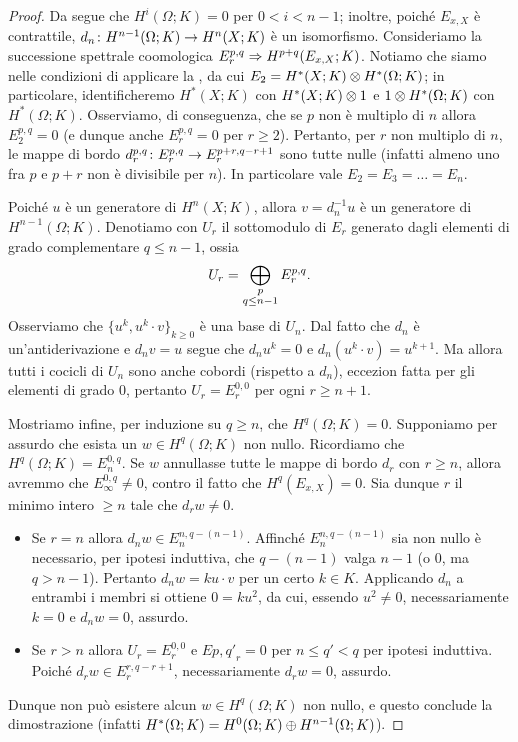 \begin{proof}
Da \missing{} segue che $H^i(\Omega;K)=0$ per $0<i<n-1$; inoltre, poiché $E_{x,X}$ è contrattile, $d_n\colon H^{n-1}(\Omega;K)\to H^n(X;K)$ è un isomorfismo.  Consideriamo la successione spettrale coomologica $E^{p,q}_r\Rightarrow H^{p+q}(E_{x,X};K)$. Notiamo che siamo nelle condizioni di applicare la , da cui $E_2=H^*(X;K)\mathbin{\otimes} H^*(\Omega;K)$; in particolare, identificheremo $H^*(X;K)$ con $H^*(X;K)\mathbin{\otimes} 1$ e $1\mathbin{\otimes} H^*(\Omega;K)$ con $H^*(\Omega;K)$. Osserviamo, di conseguenza, che se $p$ non è multiplo di $n$ allora $E^{p,q}_2=0$ (e dunque anche $E^{p,q}_r=0$ per $r\ge2$). Pertanto, per $r$ non multiplo di $n$, le mappe di bordo $d^{p,q}_r\colon E^{p,q}_r\to E^{p+r,q-r+1}_r$ sono tutte nulle (infatti almeno uno fra $p$ e $p+r$ non è divisibile per $n$). In particolare vale $E_2=E_3=\ldots=E_n$.

Poiché $u$ è un generatore di $H^n(X;K)$, allora $v=d_n^{-1}u$ è un generatore di $H^{n-1}(\Omega;K)$. Denotiamo con $U_r$ il sottomodulo di $E_r$ generato dagli elementi di grado complementare $q\le n-1$, ossia
$$
U_r=\bigoplus_{\substack{p\\q\le n-1}}E^{p,q}_r.
$$
Osserviamo che $\{u^k,u^k\cdot v\}_{k\ge 0}$ è una base di $U_n$. Dal fatto che $d_n$ è un'antiderivazione e $d_nv=u$ segue che $d_n u^k=0$ e $d_n(u^k\cdot v)=u^{k+1}$. Ma allora tutti i cocicli di $U_n$ sono anche cobordi (rispetto a $d_n$), eccezion fatta per gli elementi di grado $0$, pertanto $U_r=E^{0,0}_r$ per ogni $r\ge n+1$.

Mostriamo infine, per induzione su $q\ge n$, che $H^q(\Omega;K)=0$. Supponiamo per assurdo che esista un $w\in H^q(\Omega;K)$ non nullo. Ricordiamo che $H^q(\Omega;K)=E^{0,q}_n$. Se $w$ annullasse tutte le mappe di bordo $d_r$ con $r\ge n$, allora avremmo che $E^{0,q}_\infty\neq 0$, contro il fatto che $H^q(E_{x,X})=0$. Sia dunque $r$ il minimo intero $\ge n$ tale che $d_rw\neq 0$.
\begin{itemize}
\item Se $r=n$ allora $d_nw\in E^{n,q-(n-1)}_n$. Affinché $E^{n,q-(n-1)}_n$ sia non nullo è necessario, per ipotesi induttiva, che $q-(n-1)$ valga $n-1$ (o $0$, ma $q>n-1$). Pertanto $d_nw=ku\cdot v$ per un certo $k\in K$. Applicando $d_n$ a entrambi i membri si ottiene $0=ku^2$, da cui, essendo $u^2\neq 0$, necessariamente $k=0$ e $d_nw=0$, assurdo.
\item Se $r>n$ allora $U_r=E^{0,0}_r$ e $E{p,q'}_r=0$ per $n\le q'<q$ per ipotesi induttiva. Poiché $d_rw\in E^{r,q-r+1}_r$, necessariamente $d_rw=0$, assurdo.
\end{itemize}
Dunque non può esistere alcun $w\in H^q(\Omega;K)$ non nullo, e questo conclude la dimostrazione (infatti $H^*(\Omega;K)=H^0(\Omega;K)\mathbin{\oplus} H^{n-1}(\Omega;K)$).
\end{proof}

